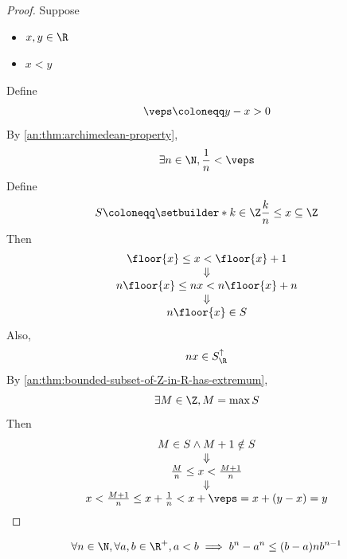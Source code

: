 \begin{proof}
  Suppose
  \begin{itemize}
    \item $x, y \in \R$
    \item $x < y$
  \end{itemize}
  Define
  \[
    \veps \coloneqq y - x > 0
  \]
  By \cref{an:thm:archimedean-property},
  \[
    \exists n \in \N, \frac{1}{n} < \veps
  \]
  Define
  \[
    S \coloneqq \setbuilder*{k \in \Z}{\frac{k}{n} \leq x} \subseteq \Z
  \]
  Then
  \[
    \begin{array}{c}
      \floor{x} \leq x < \floor{x} + 1    \\
      \Downarrow                          \\
      n\floor{x} \leq nx < n\floor{x} + n \\
      \Downarrow                          \\
      n\floor{x} \in S
    \end{array}
  \]
  Also,
  \[
    nx \in S_{\R}^{\uparrow}
  \]
  By \cref{an:thm:bounded-subset-of-Z-in-R-has-extremum},
  \[
    \exists M \in \Z, M = \max S
  \]
  Then
  \[
    \begin{array}{c}
      M \in S \land M + 1 \notin S         \\
      \Downarrow                           \\
      \frac{M}{n} \leq x < \frac{M + 1}{n} \\
      \Downarrow                           \\
      x < \frac{M + 1}{n} \leq x + \frac{1}{n} < x + \veps = x + (y - x) = y
    \end{array}
  \]
\end{proof}

\bigskip

\begin{lemma} \label{an:lem:nth-power-is-lipschitz}
  \[
    \forall n \in \N, \forall a, b \in \R^{+}, a < b \implies b^{n} - a^{n} \leq (b - a)nb^{n - 1}
  \]
\end{lemma}
